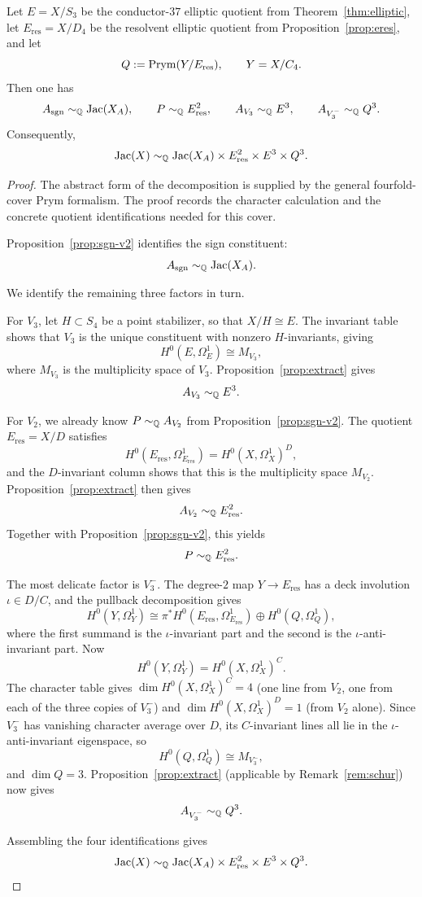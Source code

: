 \begin{theorem}\label{thm:full-factor}
Let \(E=X/S_3\) be the conductor-\(37\) elliptic quotient from Theorem~\ref{thm:elliptic}, let \(E_{\mathrm{res}}=X/D_4\) be the resolvent elliptic quotient from Proposition~\ref{prop:eres}, and let
\[
Q:=\operatorname{Prym}(Y/E_{\mathrm{res}}),\qquad Y=X/C_4.
\]
Then one has
\[
A_{\mathrm{sgn}}\sim_{\mathbb{Q}}\operatorname{Jac}(X_A),\qquad
P\sim_{\mathbb{Q}} E_{\mathrm{res}}^2,\qquad
A_{V_3}\sim_{\mathbb{Q}} E^3,\qquad
A_{V_3^-}\sim_{\mathbb{Q}} Q^3.
\]
Consequently,
\[
\operatorname{Jac}(X)\sim_{\mathbb{Q}}\operatorname{Jac}(X_A)\times E_{\mathrm{res}}^2\times E^3\times Q^3.
\]
\end{theorem}

\begin{proof}
The abstract form of the decomposition is supplied by the general fourfold-cover Prym formalism. The proof records the character calculation and the concrete quotient identifications needed for this cover.

Proposition~\ref{prop:sgn-v2} identifies the sign constituent:
\[
A_{\mathrm{sgn}}\sim_{\mathbb{Q}}\operatorname{Jac}(X_A).
\]

We identify the remaining three factors in turn.

For \(V_3\), let \(H\subset S_4\) be a point stabilizer, so that \(X/H\cong E\). The invariant table shows that \(V_3\) is the unique constituent with nonzero \(H\)-invariants, giving
\[
H^0(E,\Omega_E^1)\cong M_{V_3},
\]
where \(M_{V_3}\) is the multiplicity space of \(V_3\). Proposition~\ref{prop:extract} gives
\[
A_{V_3}\sim_{\mathbb{Q}} E^3.
\]

For \(V_2\), we already know \(P\sim_{\mathbb{Q}}A_{V_2}\) from Proposition~\ref{prop:sgn-v2}. The quotient \(E_{\mathrm{res}}=X/D\) satisfies
\[
H^0(E_{\mathrm{res}},\Omega_{E_{\mathrm{res}}}^1)=H^0(X,\Omega_X^1)^D,
\]
and the \(D\)-invariant column shows that this is the multiplicity space \(M_{V_2}\). Proposition~\ref{prop:extract} then gives
\[
A_{V_2}\sim_{\mathbb{Q}} E_{\mathrm{res}}^2.
\]
Together with Proposition~\ref{prop:sgn-v2}, this yields
\[
P\sim_{\mathbb{Q}}E_{\mathrm{res}}^2.
\]

The most delicate factor is \(V_3^-\). The degree-\(2\) map \(Y\to E_{\mathrm{res}}\) has a deck involution \(\iota\in D/C\), and the pullback decomposition gives
\[
H^0(Y,\Omega_Y^1)\cong \pi^*H^0(E_{\mathrm{res}},\Omega_{E_{\mathrm{res}}}^1)\oplus H^0(Q,\Omega_Q^1),
\]
where the first summand is the \(\iota\)-invariant part and the second is the \(\iota\)-anti-invariant part.
Now
\[
H^0(Y,\Omega_Y^1)=H^0(X,\Omega_X^1)^C.
\]
The character table gives \(\dim H^0(X,\Omega_X^1)^C=4\) (one line from \(V_2\), one from each of the three copies of \(V_3^-\)) and \(\dim H^0(X,\Omega_X^1)^D=1\) (from \(V_2\) alone). Since \(V_3^-\) has vanishing character average over \(D\), its \(C\)-invariant lines all lie in the \(\iota\)-anti-invariant eigenspace, so
\[
H^0(Q,\Omega_Q^1)\cong M_{V_3^-},
\]
and \(\dim Q=3\). Proposition~\ref{prop:extract} (applicable by Remark~\ref{rem:schur}) now gives
\[
A_{V_3^-}\sim_{\mathbb{Q}} Q^3.
\]

Assembling the four identifications gives
\[
\operatorname{Jac}(X)\sim_{\mathbb{Q}}\operatorname{Jac}(X_A)\times E_{\mathrm{res}}^2\times E^3\times Q^3.
\]
\end{proof}

